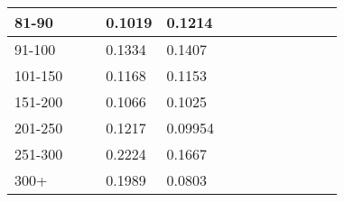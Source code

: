 \begin{table*}[]
\begin{tabular}{|l|l|l|l|l|l|l|l|l|l|l|l|l|}
        81-90   &                                &                                & 0.1019                         & 0.1214                         &                                &                                &         &           &         &           &         &           \\ \hline
        91-100  &                                &                                & 0.1334                         & 0.1407                         &                                &                                &         &           &         &           &         &           \\ \hline
        101-150 &                                &                                & 0.1168                         & 0.1153                         &                                &                                &         &           &         &           &         &           \\ \hline
        151-200 &                                &                                & 0.1066                         & 0.1025                         &                                &                                &         &           &         &           &         &           \\ \hline
        201-250 &                                &                                & 0.1217                         & 0.09954                        &                                &                                &         &           &         &           &         &           \\ \hline
        251-300 &                                &                                & 0.2224                         & 0.1667                         &                                &                                &         &           &         &           &         &           \\ \hline
        300+    &                                &                                & 0.1989                         & 0.0803                         &                                &                                &         &           &         &           &         &           \\ \hline
    \end{tabular}
\end{table*}
